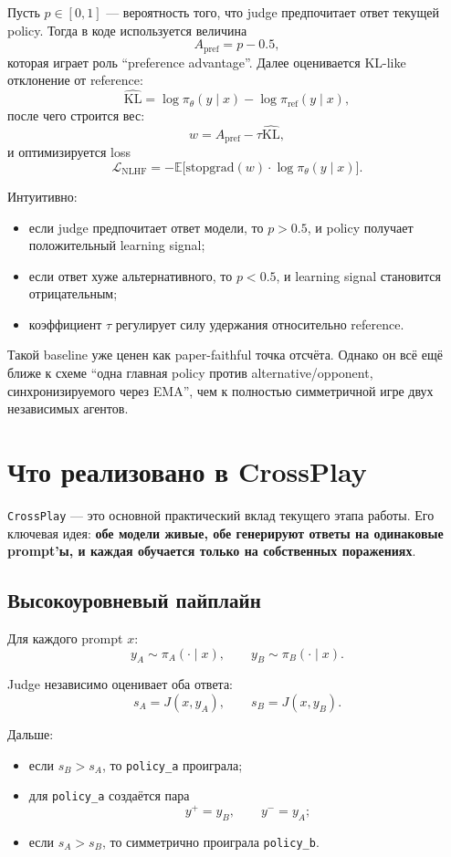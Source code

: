 \documentclass[11pt,a4paper]{article}
\begin{document}
Пусть $p \in [0,1]$ --- вероятность того, что judge предпочитает ответ текущей policy. Тогда в коде используется величина
\[
A_{\mathrm{pref}} = p - 0.5,
\]
которая играет роль ``preference advantage''. Далее оценивается KL-like отклонение от reference:
\[
\widehat{\mathrm{KL}} = \log \pi_\theta(y \mid x) - \log \pi_{\mathrm{ref}}(y \mid x),
\]
после чего строится вес:
\[
w = A_{\mathrm{pref}} - \tau \widehat{\mathrm{KL}},
\]
и оптимизируется loss
\[
\mathcal L_{\mathrm{NLHF}}
=
-
\mathbb E\bigl[\mathrm{stopgrad}(w)\cdot \log \pi_\theta(y \mid x)\bigr].
\]

Интуитивно:
\begin{itemize}
  \item если judge предпочитает ответ модели, то $p > 0.5$, и policy получает положительный learning signal;
  \item если ответ хуже альтернативного, то $p < 0.5$, и learning signal становится отрицательным;
  \item коэффициент $\tau$ регулирует силу удержания относительно reference.
\end{itemize}

Такой baseline уже ценен как paper-faithful точка отсчёта. Однако он всё ещё ближе к схеме ``одна главная policy против alternative/opponent, синхронизируемого через EMA'', чем к полностью симметричной игре двух независимых агентов.

\section{Что реализовано в CrossPlay}

\texttt{CrossPlay} --- это основной практический вклад текущего этапа работы. Его ключевая идея: \textbf{обе модели живые, обе генерируют ответы на одинаковые prompt'ы, и каждая обучается только на собственных поражениях}.

\subsection{Высокоуровневый пайплайн}

Для каждого prompt $x$:
\[
y_A \sim \pi_A(\cdot \mid x),
\qquad
y_B \sim \pi_B(\cdot \mid x).
\]

Judge независимо оценивает оба ответа:
\[
s_A = J(x, y_A),
\qquad
s_B = J(x, y_B).
\]

Дальше:
\begin{itemize}
  \item если $s_B > s_A$, то \texttt{policy\_a} проиграла;
  \item для \texttt{policy\_a} создаётся пара
  \[
  y^+ = y_B,\qquad y^- = y_A;
  \]
  \item если $s_A > s_B$, то симметрично проиграла \texttt{policy\_b}.
\end{itemize}
\end{document}
